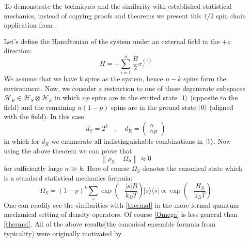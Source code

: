 \documentclass[a4paper,12pt]{article}
\begin{document}
To demonstrate the techniques and the similarity with established statistical mechanics, instead of copying proofs and theorems we present this $1/2$ spin chain application from \cite{popescu2006entanglement}.
\par Let's define the Hamiltonian of the system under an external field in the $+z$ direction:
\begin{equation}
H=-\sum_{i=1}^{n} \frac{B}{2} \sigma_{z}^{(i)}
\end{equation}
We assume that we have $k$ spins as the system, hence $n-k$ spins form the environment. Now, we consider a restriction to one of these degenerate subspaces $\mathcal{H}_{R} \in \mathcal{H}_{S} \otimes \mathcal{H}_{E}$ in which $n p$ spins are in the excited state $\ket{1}$ (opposite to the field) and the remaining $n(1-p)$ spins are in the ground state
$\ket{0}$ (aligned with the field). In this case:
\begin{equation}
d_{S}=2^k \quad , \quad
d_{R}=\left(\begin{array}{c}
n \\
n p
\end{array}\right)
\end{equation}
in which for $d_{R}$ we enumerate all indistinguishable combinations in $\ket{1}$. Now using the above theorem we can prove that
\begin{equation}
\left\|\rho_{S}-\Omega_{S}\right\| \approx 0
\end{equation}
for sufficiently large $n \gg k$. Here of course $\Omega_{S}$ denotes the canonical state which is a standard statistical mechanics formula:
\begin{equation}
\Omega_{S}=(1-p)^{k} \sum_{s} \exp \left(-\frac{|s| B}{\mathrm{k}_{B} T}\right)|s\rangle\langle s|
\propto \exp \left(-\frac{H_{S}}{\mathrm{k}_{B} T}\right)
\label{Omega}
\end{equation}
One can readily see the similarities with \eqref{thermal} in the more formal quantum mechanical setting of density operators. Of course \eqref{Omega} is less general than \eqref{thermal}. All of the above results(the canonical ensemble formula from typicality) were originally motivated by \cite{goldstein2006canonical}
\end{document}
